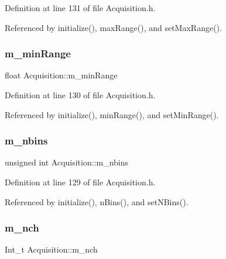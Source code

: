Definition at line 131 of file Acquisition.\+h.



Referenced by initialize(), max\+Range(), and set\+Max\+Range().

\mbox{\label{classAcquisition_a06b3ea027ebdcb15f64a6517ceb99b76}} 
\subsubsection{\texorpdfstring{m\+\_\+min\+Range}{m\_minRange}}
{\footnotesize\ttfamily float Acquisition\+::m\+\_\+min\+Range\hspace{0.3cm}{\ttfamily [private]}}



Definition at line 130 of file Acquisition.\+h.



Referenced by initialize(), min\+Range(), and set\+Min\+Range().

\mbox{\label{classAcquisition_a05bccdc4b9ada37beaeba8794ccef12d}} 
\subsubsection{\texorpdfstring{m\+\_\+nbins}{m\_nbins}}
{\footnotesize\ttfamily unsigned int Acquisition\+::m\+\_\+nbins\hspace{0.3cm}{\ttfamily [private]}}



Definition at line 129 of file Acquisition.\+h.



Referenced by initialize(), n\+Bins(), and set\+N\+Bins().

\mbox{\label{classAcquisition_a1860c7a03a65ea7a778d30dd4a40e1e1}} 
\subsubsection{\texorpdfstring{m\+\_\+nch}{m\_nch}}
{\footnotesize\ttfamily Int\+\_\+t Acquisition\+::m\+\_\+nch\hspace{0.3cm}{\ttfamily [private]}}



